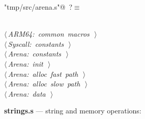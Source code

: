 \documentclass[11pt,a4paper,twoside,openright,DIV=15]{scrbook}
\theoremstyle{definition}
\theoremstyle{plain}
\theoremstyle{remark}
\begin{document}
\begin{flushleft} \small
\begin{minipage}{\linewidth}\label{scrap87}\raggedright\small
{} \verb@"tmp/src/arena.s"@\nobreak\ {\footnotesize {?}}$\equiv$
\vspace{-1ex}
\begin{list}{}{} \item
\mbox{}\verb@@\\
\mbox{}\verb@@\hbox{$\langle\,${\itshape ARM64: common macros}\nobreak\ {\footnotesize {}}$\,\rangle$}\verb@@\\
\mbox{}\verb@@\hbox{$\langle\,${\itshape Syscall: constants}\nobreak\ {\footnotesize {}}$\,\rangle$}\verb@@\\
\mbox{}\verb@@\hbox{$\langle\,${\itshape Arena: constants}\nobreak\ {\footnotesize {}}$\,\rangle$}\verb@@\\
\mbox{}\verb@@\hbox{$\langle\,${\itshape Arena: init}\nobreak\ {\footnotesize {}}$\,\rangle$}\verb@@\\
\mbox{}\verb@@\hbox{$\langle\,${\itshape Arena: alloc fast path}\nobreak\ {\footnotesize {}}$\,\rangle$}\verb@@\\
\mbox{}\verb@@\hbox{$\langle\,${\itshape Arena: alloc slow path}\nobreak\ {\footnotesize {}}$\,\rangle$}\verb@@\\
\mbox{}\verb@@\hbox{$\langle\,${\itshape Arena: data}\nobreak\ {\footnotesize {}}$\,\rangle$}\verb@@\\
\mbox{}\verb@@{\NWsep}
\end{list}
\vspace{-1.5ex}
\footnotesize
\begin{list}{}{\setlength{\itemsep}{-\parsep}\setlength{\itemindent}{-\leftmargin}}

\item{}
\end{list}
\end{minipage}\vspace{4ex}
\end{flushleft}
\noindent\textbf{strings.s} --- string and memory operations:
\end{document}
